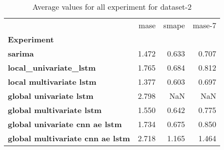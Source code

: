 \begin{table}[h]
\centering
\caption{Average values for all experiment for dataset-2}
\label{table:Average-metric-dataset-2}
\begin{tabular}{lrrr}
\toprule
{} &   mase &  smape &  mase-7 \\
\textbf{Experiment                     } &        &        &         \\
\midrule
\textbf{sarima                         } &  1.472 &  0.633 &   0.707 \\
\textbf{local\_univariate\_lstm          } &  1.765 &  0.684 &   0.812 \\
\textbf{local multivariate lstm        } &  1.377 &  0.603 &   0.697 \\
\textbf{global univariate lstm         } &  2.798 &    NaN &     NaN \\
\textbf{global multivariate lstm       } &  1.550 &  0.642 &   0.775 \\
\textbf{global univariate cnn ae lstm  } &  1.734 &  0.675 &   0.850 \\
\textbf{global multivariate cnn ae lstm} &  2.718 &  1.165 &   1.464 \\
\bottomrule
\end{tabular}
\end{table}
